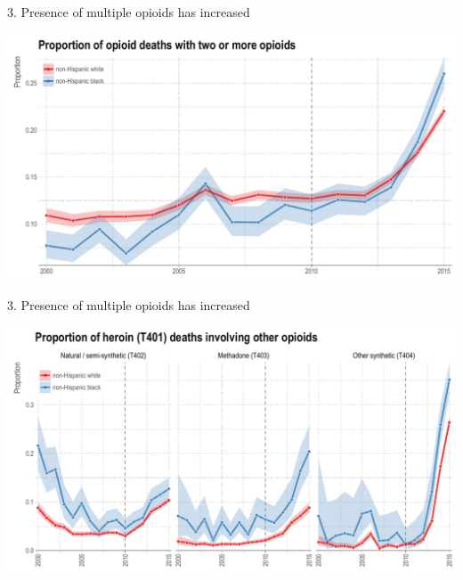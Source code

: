 \documentclass[ignorenonframetext,]{beamer}
\begin{document}
\begin{frame}{3. Presence of multiple opioids has increased}

\centering
\includegraphics[width=1.0\textwidth]{./plots/fig8_prop_2_more_ci_v.pdf}

\end{frame}

\begin{frame}{3. Presence of multiple opioids has increased}

\centering
\includegraphics[width=1.0\textwidth]{./plots/fig9_t401_combos_v_ci.pdf}

\end{frame}
\end{document}
